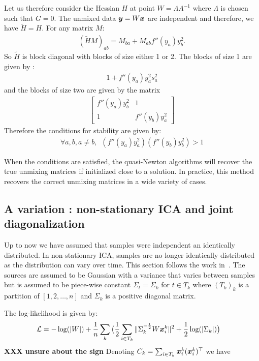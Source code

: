 Let us therefore consider the Hessian $H$ at point $W = \Lambda A^{-1}$ where
$\Lambda$ is chosen such that $G = 0$. The unmixed data $\boldsymbol{y} = W \boldsymbol{x}$ are independent and
therefore, we have $\tilde{H} = H$.
For any matrix $M$:
\begin{align}(\tilde{H} M)_{ab} = M_{ba} + M_{ab} f''(y_a)y_b^2.
\end{align}
So $\tilde{H}$ is block diagonal with blocks of size either 1 or 2.
The blocks of size 1 are given by :
\begin{align}
  1 + f''(y_a) y_a^2
  s_a^2
\end{align}
and the blocks of size
two are given by the matrix
\begin{align}
                              \begin{bmatrix} f''(y_a) y_b^2
  & 1 \\ 1 &
  f''(y_b)y_a^2 \end{bmatrix}
\end{align}
Therefore the conditions for stability are given by:
\begin{align}
  \forall a, b, a \neq b, \enspace \left(f''(y_a) y_a^2 \right) \left(f''(y_b)  y_b^2 \right) > 1
\end{align}

When the conditions are satisfied, the quasi-Newton algorithms will recover the
true unmixing matrices if initialized close to a solution. In practice, this
method recovers the correct unmixing matrices in a wide variety of cases.

\subsection{A variation : non-stationary ICA and joint diagonalization}
Up to now we have assumed that samples were independent an identically distributed. In non-stationary ICA, samples are no longer identically distributed as the distribution can vary over time.
This section follows the work in~\cite{pham2001blind}.
The sources are assumed to be Gaussian with a variance that varies between
samples but is assumed to be piece-wise constant $\Sigma_t = \Sigma_k$ for $t \in
T_k$ where $(T_k)_k$ is a partition of $[1, 2, \dots, n]$ and $\Sigma_k$ is a
positive diagonal matrix.

The log-likelihood is given by:
\begin{align}  
  \mathcal{L} &= -\log(|W|)  + \frac1{n} \sum_k \big( \frac12 \sum_{i \in T_k}\|\Sigma_k^{-\frac12} W \boldsymbol{x}^k_i \|^2 + \frac12 \log(|\Sigma_k|) \big)
\end{align}
\textbf{XXX unsure about the sign}
Denoting $C_k = \sum_{i \in T_k} \boldsymbol{x}_i^k (\boldsymbol{x}_i^k)^{\top}$ we have 

